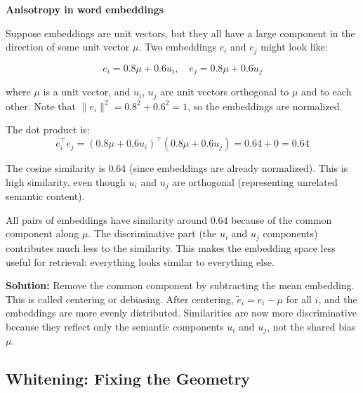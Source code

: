 \begin{examplebox}
\textbf{Anisotropy in word embeddings}

\vspace{0.5em}

Suppose embeddings are unit vectors, but they all have a large component in the direction of some unit vector $\mu$. Two embeddings $e_i$ and $e_j$ might look like:

\begin{equation*}
e_i = 0.8 \mu + 0.6 u_i, \quad e_j = 0.8 \mu + 0.6 u_j
\end{equation*}

where $\mu$ is a unit vector, and $u_i$, $u_j$ are unit vectors orthogonal to $\mu$ and to each other. Note that $\|e_i\|^2 = 0.8^2 + 0.6^2 = 1$, so the embeddings are normalized.

\vspace{0.5em}

The dot product is:
\begin{equation*}
e_i^\top e_j = (0.8 \mu + 0.6 u_i)^\top (0.8 \mu + 0.6 u_j) = 0.64 + 0 = 0.64
\end{equation*}

The cosine similarity is 0.64 (since embeddings are already normalized). This is high similarity, even though $u_i$ and $u_j$ are orthogonal (representing unrelated semantic content).

\vspace{0.5em}

All pairs of embeddings have similarity around 0.64 because of the common component along $\mu$. The discriminative part (the $u_i$ and $u_j$ components) contributes much less to the similarity. This makes the embedding space less useful for retrieval: everything looks similar to everything else.

\vspace{0.5em}

\textbf{Solution:} Remove the common component by subtracting the mean embedding. This is called centering or debiasing. After centering, $\tilde{e}_i = e_i - \mu$ for all $i$, and the embeddings are more evenly distributed. Similarities are now more discriminative because they reflect only the semantic components $u_i$ and $u_j$, not the shared bias $\mu$.
\end{examplebox}

\vspace{1.5em}

\subsection{Whitening: Fixing the Geometry}

